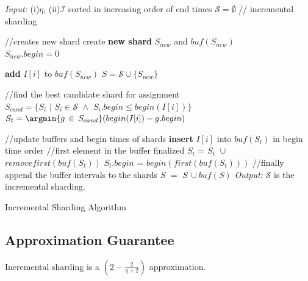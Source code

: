  \begin{algorithm}[htb]
   \begin{algorithmic}[1]
     \STATE  \emph{Input:} (i)$\eta$, (ii)$\mathcal{I}$ sorted in increasing order of end times
     \STATE $\mathcal{S} = \emptyset$ \quad // incremental sharding
 		
	\STATE {} 
	\STATE //creates new shard
        		\STATE create \textbf{new shard} $S_{new}$ and $bu\!f(S_{new})$ \\
				\STATE $S_{new}.begin = 0$
			
			\STATE \textbf{add} $I[i]$ to $bu\!f(S_{new})$  
                     \STATE $S = \mathcal{S} \cup \{S_{new}\}$
        \ENDIF

	\STATE 

			\STATE //find the best candidate shard for assignment
			\STATE $S_{cand} = \{ S_i \,\,|\,\, S_i \in \mathcal{S} \,\, \wedge  \,\,S_i.begin \leq begin(I[i])\}$
			\STATE $S_{t} =\argmin{g\, \in \,S_{cand}} (begin(I[i]) - g.begin)$ 

		\STATE
		\STATE //update buffers and begin times of shards
			\STATE \textbf{insert} $I[i]$ into $bu\!f(S_{t})$ in begin time order			 
		\ENDIF
			\STATE  //first element in the buffer finalized
			\STATE $S_{t}$ = $S_{t} \,\, \cup$  $removefirst(bu\!f(S_{t}))$
			\STATE  $S_{t}.begin$ = $begin(first (bu\!f(S_t)))$
		\ENDIF        
   	\ENDFOR 
	\STATE
	\STATE //finally append the buffer intervals to the shards
		\STATE	$S \,\,= \,\, S \,\cup bu\!f(S)$
	\ENDFOR
\STATE
\STATE\emph{Output:} $\mathcal{S}$  is the incremental sharding.

   \end{algorithmic}
   \caption{Incremental Sharding Algorithm}
   \label{alg:rs-inc}
 \end{algorithm}


\subsection{Approximation Guarantee}
\label{proof:approx_guarantee}

\begin{theorem}
\label{thm:inc_sharding}  
Incremental sharding is a $(2- \frac{2}{\eta+2})$ approximation.
\end{theorem}


